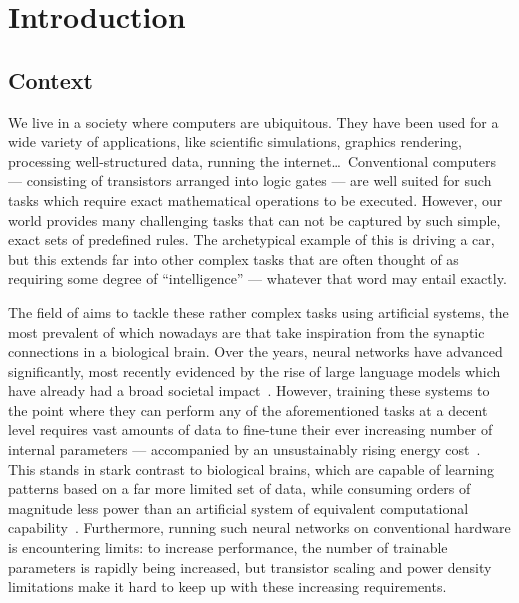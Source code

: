 \chapter{Introduction}\label{ch:Introduction}

\section{Context}
We live in a society where computers are ubiquitous. %
They have been used for a wide variety of applications, like scientific simulations, graphics rendering, processing well-structured data, running the internet\dots\,
Conventional computers --- consisting of transistors arranged into logic gates --- are well suited for such tasks which require exact mathematical operations to be executed.
However, our world provides many challenging tasks that can not be captured by such simple, exact sets of predefined rules.
The archetypical example of this is driving a car, but this extends far into other complex tasks that are often thought of as requiring some degree of ``intelligence'' --- whatever that word may entail exactly. \par
The field of  aims to tackle these rather complex tasks using artificial systems, the most prevalent of which nowadays are  that take inspiration from the synaptic connections in a biological brain.
Over the years, neural networks have advanced significantly, most recently evidenced by the rise of large language models which have already had a broad societal impact~\cite{ImprovingLanguageGPT,GPT-4}.
However, training these systems to the point where they can perform any of the aforementioned tasks at a decent level requires vast amounts of data to fine-tune their ever increasing number of internal parameters --- accompanied by an unsustainably rising energy cost~\cite{QuantumNeuromorphicOpportunities,BLOOM_CarbonFootprint_176Bparam}.
This stands in stark contrast to biological brains, which are capable of learning patterns based on a far more limited set of data, while consuming orders of magnitude less power than an artificial system of equivalent computational capability~\cite{NeuromorphicSpintronics}.
Furthermore, running such neural networks on conventional hardware is encountering limits: to increase performance, the number of trainable parameters is rapidly being increased, but transistor scaling and power density limitations make it hard to keep up with these increasing requirements. %
